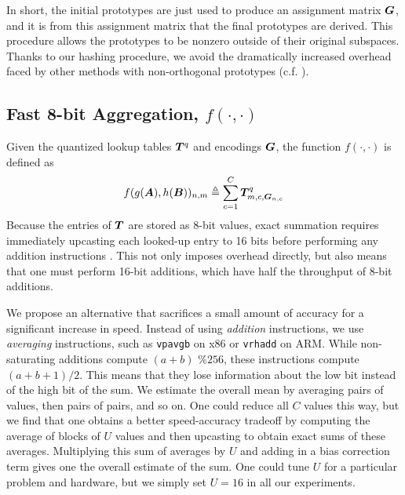 In short, the initial prototypes are just used to produce an assignment matrix $\bm{G}$, and it is from this assignment matrix that the final prototypes are derived. This procedure allows the prototypes to be nonzero outside of their original subspaces. Thanks to our hashing procedure, we avoid the dramatically increased overhead faced by other methods with non-orthogonal prototypes (c.f. \cite{otq,aq,cq,grvq,lsq,stackedQuantizers}).

\subsection{Fast 8-bit Aggregation, $f(\cdot,\cdot)$} \label{sec:aggregate}

Given the quantized lookup tables $\bm{T}^{q}$ and encodings $\bm{G}$, the function $f(\cdot,\cdot)$ is defined as
\begin{align}
    f(g(\bm{A}), h(\bm{B}))_{n,m} \triangleq \sum_{c=1}^C \bm{T}^{q}_{m,c,\bm{G}_{n,c}}
\end{align}
Because the entries of $\bm{T}$ are stored as 8-bit values, exact summation requires immediately upcasting each looked-up entry to 16 bits before performing any addition instructions \cite{bolt}. This not only imposes overhead directly, but also means that one must perform 16-bit additions, which have half the throughput of 8-bit additions.

We propose an alternative that sacrifices a small amount of accuracy for a significant increase in speed. Instead of using \textit{addition} instructions, we use \textit{averaging} instructions, such as \texttt{vpavgb} on x86 or \texttt{vrhadd} on ARM. While non-saturating additions compute $(a + b) \text{ \% } 256$, these instructions compute $(a + b + 1) / 2$. This means that they lose information about the low bit instead of the high bit of the sum. We estimate the overall mean by averaging pairs of values, then pairs of pairs, and so on. One could reduce all $C$ values this way, but we find that one obtains a better speed-accuracy tradeoff by computing the average of blocks of $U$ values and then upcasting to obtain exact sums of these averages. Multiplying this sum of averages by $U$ and adding in a bias correction term gives one the overall estimate of the sum. One could tune $U$ for a particular problem and hardware, but we simply set $U = 16$ in all our experiments.

